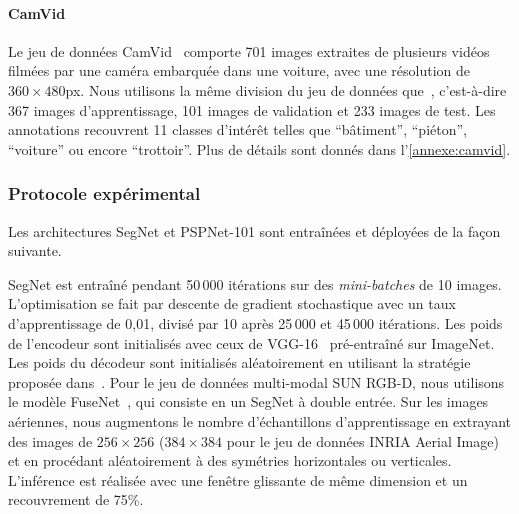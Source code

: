 \paragraph{CamVid}
Le jeu de données CamVid~\cite{brostow_semantic_2009} comporte 701 images extraites de plusieurs vidéos filmées par une caméra embarquée dans une voiture, avec une résolution de $360\times480$px. Nous utilisons la même division du jeu de données que~\cite{badrinarayanan_segnet_2017}, c'est-à-dire 367 images d'apprentissage, 101 images de validation et 233 images de test. Les annotations recouvrent 11 classes d'intérêt telles que ``bâtiment'', ``piéton'', ``voiture'' ou encore ``trottoir''. Plus de détails sont donnés dans l'\cref{annexe:camvid}.

\subsubsection{Protocole expérimental}

Les architectures SegNet et PSPNet-101 sont entraînées et déployées de la façon suivante.

SegNet est entraîné pendant 50\,000 itérations sur des \emph{mini-batches} de 10 images. L'optimisation se fait par descente de gradient stochastique avec un taux d'apprentissage de 0,01, divisé par 10 après 25\,000 et 45\,000 itérations. Les poids de l'encodeur sont initialisés avec ceux de VGG-16~\cite{simonyan_very_2014} pré-entraîné sur ImageNet. Les poids du décodeur sont initialisés aléatoirement en utilisant la stratégie proposée dans~\cite{he_delving_2015}.
Pour le jeu de données multi-modal SUN RGB-D, nous utilisons le modèle FuseNet~\cite{hazirbas_fusenet_2016}, qui consiste en un SegNet à double entrée.
Sur les images aériennes, nous augmentons le nombre d'échantillons d'apprentissage en extrayant des images de $256\times256$ ($384\times384$ pour le jeu de données INRIA Aerial Image) et en procédant aléatoirement à des symétries horizontales ou verticales. L'inférence est réalisée avec une fenêtre glissante de même dimension et un recouvrement de 75\%.

